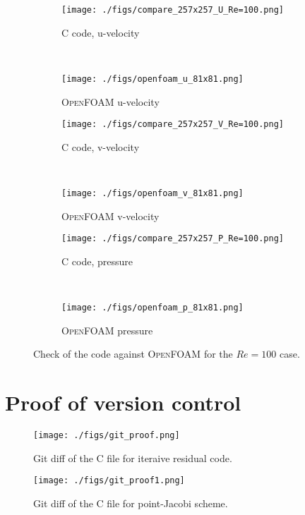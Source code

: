 \documentclass[10pt, letterpaper]{article}
\begin{document}
\begin{figure}[p]
	\centering
	\begin{subfigure}[b]{0.475\textwidth}
		\centering
		\texttt{[image: ./figs/compare\_257x257\_U\_Re=100.png]}
		\caption{C code, u-velocity}
	\end{subfigure}
	~
	\begin{subfigure}[b]{0.475\textwidth}
		\centering
		\texttt{[image: ./figs/openfoam\_u\_81x81.png]}
		\caption{\textsc{OpenFOAM} u-velocity}
	\end{subfigure}
	
	\begin{subfigure}[b]{0.475\textwidth}
		\centering
		\texttt{[image: ./figs/compare\_257x257\_V\_Re=100.png]}
		\caption{C code, v-velocity}
	\end{subfigure}
	~
	\begin{subfigure}[b]{0.475\textwidth}
		\centering
		\texttt{[image: ./figs/openfoam\_v\_81x81.png]}
		\caption{\textsc{OpenFOAM} v-velocity}
	\end{subfigure}
	
	\begin{subfigure}[b]{0.475\textwidth}
		\centering
		\texttt{[image: ./figs/compare\_257x257\_P\_Re=100.png]}
		\caption{C code, pressure}
	\end{subfigure}
	~
	\begin{subfigure}[b]{0.475\textwidth}
		\centering
		\texttt{[image: ./figs/openfoam\_p\_81x81.png]}
		\caption{\textsc{OpenFOAM} pressure}
	\end{subfigure}
	\caption{Check of the code against \textsc{OpenFOAM} for the $Re=100$ case.}
	\label{fig:openfoam}
\end{figure}

\clearpage


\section{Proof of version control}

\begin{figure}[h]
	\centering
	\texttt{[image: ./figs/git\_proof.png]}
	\caption{Git diff of the C file for iteraive residual code.}
\end{figure}

\begin{figure}[h!]
	\centering
	\texttt{[image: ./figs/git\_proof1.png]}
	\caption{Git diff of the C file for point-Jacobi scheme.}
\end{figure}

\clearpage
\end{document}
